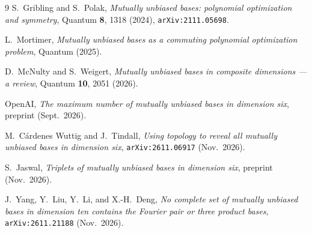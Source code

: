 \documentclass[11pt,a4paper]{article}
\theoremstyle{definition}
\begin{document}
\begin{thebibliography}{9}
S.~Gribling and S.~Polak, \emph{Mutually unbiased bases: polynomial optimization and symmetry}, Quantum \textbf{8}, 1318 (2024), \texttt{arXiv:2111.05698}.

L.~Mortimer, \emph{Mutually unbiased bases as a commuting polynomial optimization problem}, Quantum (2025).

D.~McNulty and S.~Weigert, \emph{Mutually unbiased bases in composite dimensions --- a review}, Quantum \textbf{10}, 2051 (2026).

OpenAI, \emph{The maximum number of mutually unbiased bases in dimension six}, preprint (Sept.\ 2026).

M.~C\'ardenes Wuttig and J.~Tindall, \emph{Using topology to reveal all mutually unbiased bases in dimension six}, \texttt{arXiv:2611.06917} (Nov.\ 2026).

S.~Jaswal, \emph{Triplets of mutually unbiased bases in dimension six}, preprint (Nov.\ 2026).

J.~Yang, Y.~Liu, Y.~Li, and X.-H.~Deng, \emph{No complete set of mutually unbiased bases in dimension ten contains the Fourier pair or three product bases}, \texttt{arXiv:2611.21188} (Nov.\ 2026).
\end{thebibliography}
\end{document}
